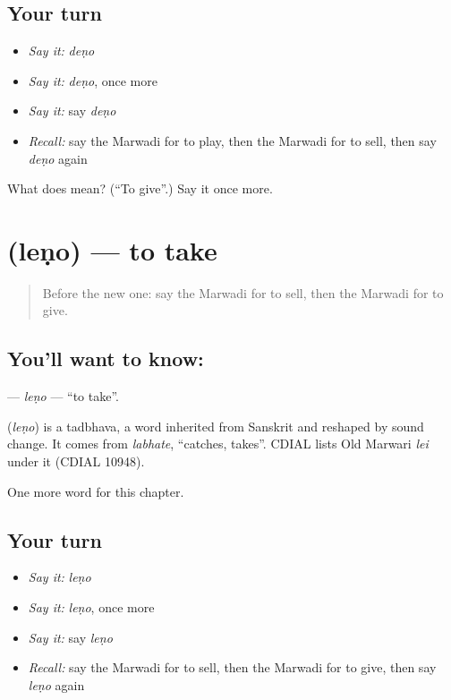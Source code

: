 \subsection*{Your turn}
\begin{itemize}
\raggedright
  \item \emph{Say it:} \emph{deṇo}
  \item \emph{Say it:} \emph{deṇo}, once more
  \item \emph{Say it:} say \emph{deṇo}
  \item \emph{Recall:} say the Marwadi for to play, then the Marwadi for to sell, then say \emph{deṇo} again
\end{itemize}

\begin{tcolorbox}[breakable,colback=teal!4,colframe=teal!35!black,title={Before you move on}]
What does  mean? (\textquotedblleft{}To give\textquotedblright{}.) Say it once more.
\end{tcolorbox}
\section[\texorpdfstring{\mw{लेणो} (leṇo)}{लेणो (leṇo)}]{ (leṇo) — to take}

\label{lesson:MW-C53-leno}



\begin{quote}
Before the new one: say the Marwadi for to sell, then the Marwadi for to give.
\end{quote}

\subsection*{You'll want to know: }
\textbf{} — \emph{leṇo} — \textquotedblleft{}to take\textquotedblright{}.

\begin{cousinweb}
\textbf{} (\emph{leṇo}) is a tadbhava, a word inherited from Sanskrit and reshaped by sound change. It comes from \emph{labhate}, \textquotedblleft{}catches, takes\textquotedblright{}. CDIAL lists Old Marwari \emph{lei} under it (CDIAL 10948).
\end{cousinweb}

\begin{grammarlens}[title={What you've built}]
One more word for this chapter.
\end{grammarlens}

\subsection*{Your turn}
\begin{itemize}
\raggedright
  \item \emph{Say it:} \emph{leṇo}
  \item \emph{Say it:} \emph{leṇo}, once more
  \item \emph{Say it:} say \emph{leṇo}
  \item \emph{Recall:} say the Marwadi for to sell, then the Marwadi for to give, then say \emph{leṇo} again
\end{itemize}

